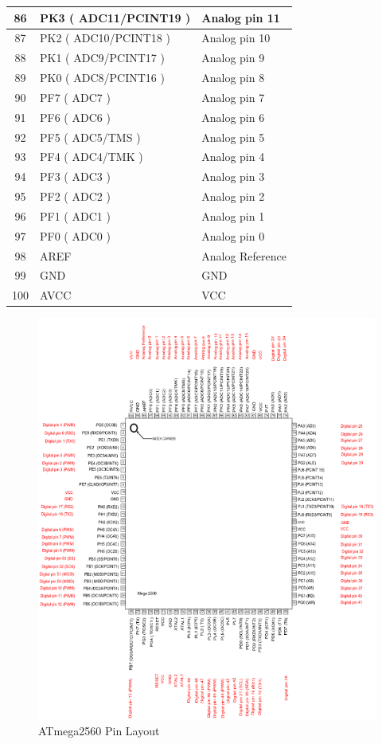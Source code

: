 \begin{appendix}
\begin{table}[h]
\begin{tabular}{|c|p{15.855em}|p{11.43em}|}
    \hline
    86    & PK3 ( ADC11/PCINT19 ) & Analog pin 11 \\
    \hline
    87    & PK2 ( ADC10/PCINT18 ) & Analog pin 10 \\
    \hline
    88    & PK1 ( ADC9/PCINT17 ) & Analog pin 9 \\
    \hline
    89    & PK0 ( ADC8/PCINT16 ) & Analog pin 8 \\
    \hline
    90    & PF7 ( ADC7 ) & Analog pin 7 \\
    \hline
    91    & PF6 ( ADC6 ) & Analog pin 6 \\
    \hline
    92    & PF5 ( ADC5/TMS ) & Analog pin 5 \\
    \hline
    93    & PF4 ( ADC4/TMK ) & Analog pin 4 \\
    \hline
    94    & PF3 ( ADC3 ) & Analog pin 3 \\
    \hline
    95    & PF2 ( ADC2 ) & Analog pin 2 \\
    \hline
    96    & PF1 ( ADC1 ) & Analog pin 1 \\
    \hline
    97    & PF0 ( ADC0 ) & Analog pin 0 \\
    \hline
    98    & AREF  & Analog Reference \\
    \hline
    99    & GND   & GND \\
    \hline
    100   & AVCC  & VCC \\
    \hline
    \end{tabular}%
\end{table}%

\begin{figure}[h]
\centering
\includegraphics[width=\textwidth]{graphics/MCU/atmega2560_pins.png}
\caption{ATmega2560 Pin Layout}
\label{fig:ATmega2560PinLayout}
\end{figure}


\end{appendix}